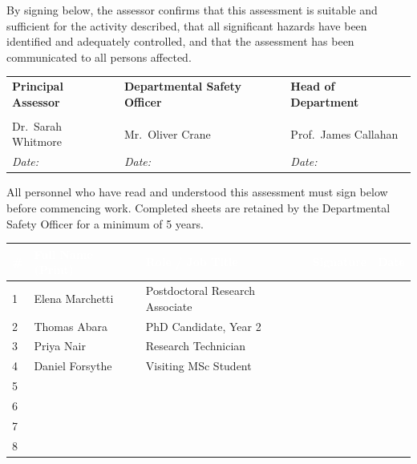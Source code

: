 \begin{tcolorbox}[signoffbox]
  By signing below, the assessor confirms that this assessment is suitable and
  sufficient for the activity described, that all significant hazards have been
  identified and adequately controlled, and that the assessment has been
  communicated to all persons affected.

  \vspace{10pt}

  \noindent
  \begin{tabularx}{\linewidth}{@{} X X X @{}}
    \textbf{Principal Assessor} & \textbf{Departmental Safety Officer} & \textbf{Head of Department} \\[16pt]
    \hrulefill & \hrulefill & \hrulefill \\[4pt]
    Dr.\ Sarah Whitmore & Mr.\ Oliver Crane & Prof.\ James Callahan \\[2pt]
    \textit{\footnotesize Date:}\,\underline{\hspace{24mm}} &
    \textit{\footnotesize Date:}\,\underline{\hspace{24mm}} &
    \textit{\footnotesize Date:}\,\underline{\hspace{24mm}} \\
  \end{tabularx}
\end{tcolorbox}

\vspace{10pt}


\vspace{4pt}

{\small
All personnel who have read and understood this assessment must sign below
before commencing work. Completed sheets are retained by the Departmental
Safety Officer for a minimum of 5 years.
}

\vspace{6pt}

\noindent
\begin{tabularx}{\linewidth}{@{}
  >{\small}p{0.5cm}
  >{\small}X
  >{\small}X
  >{\small\centering}p{2.4cm}
  >{\small\centering\arraybackslash}p{2.4cm}
  @{}}
\toprule
\rowcolor{NavyDeep}
\textcolor{white}{\textbf{\#}} &
\textcolor{white}{\textbf{Full Name (Print)}} &
\textcolor{white}{\textbf{Role / Job Title}} &
\textcolor{white}{\textbf{Signature}} &
\textcolor{white}{\textbf{Date}} \\
\midrule
1 & Elena Marchetti & Postdoctoral Research Associate & & \\[2pt]
\rowcolor{LightFog}
2 & Thomas Abara & PhD Candidate, Year 2 & & \\[2pt]
3 & Priya Nair & Research Technician & & \\[2pt]
\rowcolor{LightFog}
4 & Daniel Forsythe & Visiting MSc Student & & \\[2pt]
5 & & & & \\[2pt]
\rowcolor{LightFog}
6 & & & & \\[2pt]
7 & & & & \\[2pt]
\rowcolor{LightFog}
8 & & & & \\[2pt]
\bottomrule
\end{tabularx}

